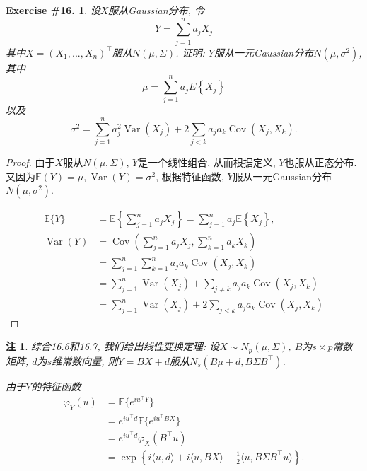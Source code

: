 \documentclass[UTF8, a4paper]{article}
\newtheorem{exercise}{Exercise \#16.}
\newtheorem*{remark}{注}
\begin{document}
\begin{framed}
\begin{exercise}
设\(X\)服从Gaussian分布, 令
$$
Y=\sum_{j=1}^n a_j X_j
$$
其中\(X = (X_1, ..., X_n)^\top\)服从\(N(\mu, \Sigma)\). 证明:
\(Y\)服从一元Gaussian分布\(N(\mu, \sigma^2)\), 其中
$$
\mu=\sum_{j=1}^n a_j E\left\{X_j\right\}
$$
以及
$$
\sigma^2=\sum_{j=1}^n a_j^2 \operatorname{Var}\left(X_j\right)+2 \sum_{j<k} a_j a_k \operatorname{Cov}\left(X_j, X_k\right).
$$
\end{exercise}
\end{framed}

\begin{proof}
由于\(X\)服从\(N(\mu, \Sigma)\), \(Y\)是一个线性组合, 从而根据定义, \(Y\)也服从正态分布.
又因为\(\mathbb{E}(Y) = \mu, \operatorname{Var}(Y) = \sigma^2\), 根据特征函数, \(Y\)服从一元Gaussian分布\(N(\mu, \sigma^2)\).

$$
\begin{aligned}
\mathbb{E}\{Y\} & =\mathbb{E}\left\{\sum_{j=1}^n a_j X_j\right\}=\sum_{j=1}^n a_j \mathbb{E}\left\{X_j\right\}, \\
\operatorname{Var}(Y) & =\operatorname{Cov}\left(\sum_{j=1}^n a_j X_j, \sum_{k=1}^n a_k X_k\right) \\
& =\sum_{j=1}^n \sum_{k=1}^n a_j a_k \operatorname{Cov}\left(X_j, X_k\right) \\
& =\sum_{j=1}^n  \operatorname{Var}\left(X_j\right)+\sum_{j \neq k} a_j a_k \operatorname{Cov}\left(X_j, X_k\right) \\
& =\sum_{j=1}^n  \operatorname{Var}\left(X_j\right)+2 \sum_{j<k} a_j a_k \operatorname{Cov}\left(X_j, X_k\right)
\end{aligned}
$$
\end{proof}

\begin{remark}
综合16.6和16.7, 我们给出线性变换定理: 设\(X \sim N_p(\mu, \Sigma)\), \(B\)为\(s \times p\)常数矩阵, \(d\)为\(s\)维常数向量, 则\(Y = BX + d\)服从\(N_s(B\mu + d, B\Sigma B^\top)\).

由于\(Y\)的特征函数 
$$
\begin{aligned}
\varphi_Y(u) &= \mathbb{E}\{e^{i u^\top Y}\} \\
&= e^{i u^\top d} \mathbb{E}\{e^{i u^\top BX}\} \\
&= e^{i u^\top d} \varphi_X(B^\top u) \\
&= \exp\left\{i \langle u, d \rangle + i \langle u, BX \rangle - \frac{1}{2} \langle u, B \Sigma B^\top u \rangle\right\}.
\end{aligned}
$$
\end{remark}
\end{document}
